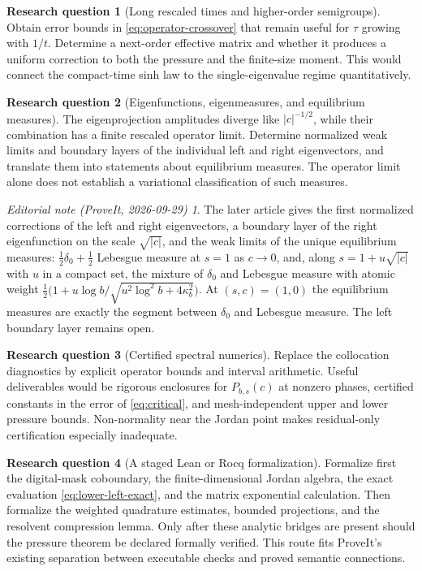 \documentclass[11pt,a4paper]{article}
\numberwithin{equation}{section}
\theoremstyle{definition}
\newtheorem{question}{Research question}
\theoremstyle{remark}
\newtheorem*{ednote}{Editorial note (ProveIt, 2026-09-29)}
\begin{document}
\begin{question}[Long rescaled times and higher-order semigroups]
Obtain error bounds in \cref{eq:operator-crossover} that remain useful
for $\tau$ growing with $1/t$. Determine a next-order effective matrix
and whether it produces a uniform correction to both the pressure and
the finite-size moment. This would connect the compact-time sinh law to
the single-eigenvalue regime quantitatively.
\end{question}

\begin{question}[Eigenfunctions, eigenmeasures, and equilibrium measures]
The eigenprojection amplitudes diverge like $|c|^{-1/2}$, while their
combination has a finite rescaled operator limit. Determine normalized
weak limits and boundary layers of the individual left and right
eigenvectors, and translate them into statements about equilibrium
measures. The operator limit alone does not establish a variational
classification of such measures.
\end{question}
\begin{ednote}
The later article
 gives the first
normalized corrections of the left and right eigenvectors, a boundary layer
of the right eigenfunction on the scale $\sqrt{|c|}$, and the weak limits of
the unique equilibrium measures: $\tfrac12\delta_0+\tfrac12$ Lebesgue
measure at $s=1$ as $c\to0$, and, along $s=1+u\sqrt{|c|}$ with $u$ in a
compact set, the mixture of $\delta_0$ and Lebesgue measure with atomic
weight $\tfrac12\bigl(1+u\log b/\sqrt{u^2\log^2b+4\kappa_b^2}\bigr)$. At
$(s,c)=(1,0)$ the equilibrium measures are exactly the segment between
$\delta_0$ and Lebesgue measure. The left boundary layer remains open.
\end{ednote}

\begin{question}[Certified spectral numerics]
Replace the collocation diagnostics by explicit operator bounds and
interval arithmetic. Useful deliverables would be rigorous enclosures
for $P_{b,s}(c)$ at nonzero phases, certified constants in the error of
\cref{eq:critical}, and mesh-independent upper and lower pressure
bounds. Non-normality near the Jordan point makes residual-only
certification especially inadequate.
\end{question}

\begin{question}[A staged Lean or Rocq formalization]
Formalize first the digital-mask coboundary, the finite-dimensional
Jordan algebra, the exact evaluation
\cref{eq:lower-left-exact}, and the matrix exponential calculation.
Then formalize the weighted quadrature estimates, bounded projections,
and the resolvent compression lemma. Only after these analytic bridges
are present should the pressure theorem be declared formally verified.
This route fits ProveIt's existing separation between executable checks
and proved semantic connections.
\end{question}
\end{document}
